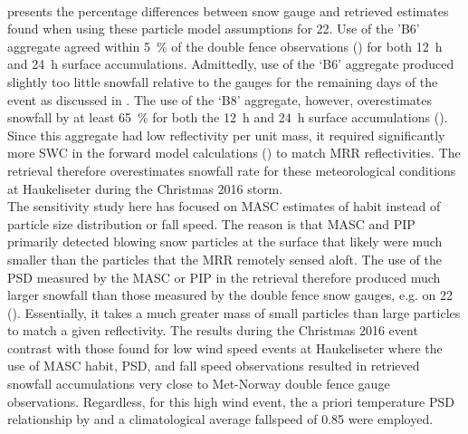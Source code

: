 \\
 presents the percentage differences between snow gauge and retrieved estimates found when using these particle model assumptions for \SI{22}{\dec}. Use of the 'B6' aggregate agreed within \SI{5}{\percent} of the double fence observations () for both \SI{12}{\hour} and \SI{24}{\hour} surface accumulations. Admittedly, use of the ‘B6’ aggregate produced slightly too little snowfall relative to the gauges for the remaining days of the event as discussed in . The use of the ‘B8’ aggregate, however, overestimates snowfall by at least \SI{65}{\percent} for both the \SI{12}{\hour} and \SI{24}{\hour} surface accumulations (). Since this aggregate had low reflectivity per unit mass, it required significantly more SWC in the forward model calculations () to match MRR reflectivities. The retrieval therefore overestimates snowfall rate for these meteorological conditions at Haukeliseter during the Christmas 2016 storm.
\\
The sensitivity study here has focused on MASC estimates of habit instead of particle size distribution or fall speed. The reason is that MASC and PIP primarily detected blowing snow particles at the surface that likely were much smaller than the particles that the MRR remotely sensed aloft. The use of the PSD measured by the MASC or PIP in the retrieval therefore produced much larger snowfall than those measured by the double fence snow gauges, e.g. on \SI{22}{\dec} (). Essentially, it takes a much greater mass of small particles than large particles to match a given reflectivity. The results during the Christmas 2016 event contrast with those found for low wind speed events at Haukeliseter where the use of MASC habit, PSD, and fall speed observations resulted in retrieved snowfall accumulations very close to Met-Norway double fence gauge observations.  Regardless, for this high wind event, the a priori temperature PSD relationship by \citet{wood_estimation_2011} and a climatological average fallspeed of \SI{0.85}{\mPs} \citep[personal communication,][]{Priv_Comm_Schirle} were employed.
